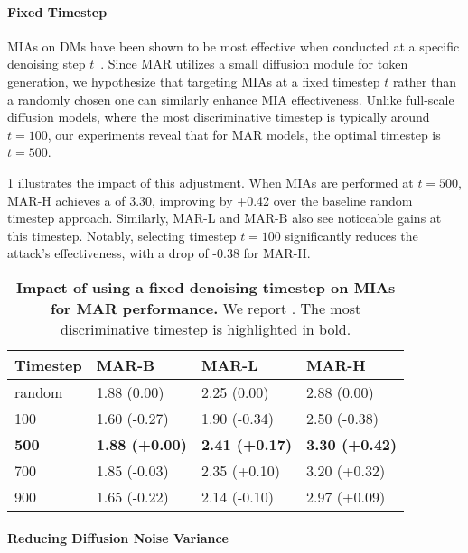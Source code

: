\paragraph{Fixed Timestep}
\label{app:fixed_timestep}

MIAs on DMs have been shown to be most effective when conducted at a specific denoising step $t$~\citep{carlini2023extracting}. Since MAR utilizes a small diffusion module for token generation, we hypothesize that targeting MIAs at a fixed timestep $t$ rather than a randomly chosen one can similarly enhance MIA effectiveness. Unlike full-scale diffusion models, where the most discriminative timestep is typically around $t = 100$, our experiments reveal that for MAR models, the optimal timestep is $t = 500$.  

\cref{tab:fixed_timestep} illustrates the impact of this adjustment. When MIAs are performed at $t = 500$, MAR-H achieves a \tprat{} of 3.30, improving by +0.42 over the baseline random timestep approach. Similarly, MAR-L and MAR-B also see noticeable gains at this timestep. Notably, selecting timestep $t = 100$ significantly reduces the attack's effectiveness, with a drop of -0.38 for MAR-H. 


\begin{table}[h!]
    \centering
    \scriptsize
    \caption{\textbf{Impact of  using a fixed denoising timestep on MIAs for MAR performance.} We report \tprat. The most discriminative timestep is highlighted in bold.}
    \label{tab:fixed_timestep}
\begin{tabular}{llll}
\toprule
Timestep & MAR-B & MAR-L & MAR-H \\
\midrule
random & 1.88 (0.00) & 2.25 (0.00) & 2.88 (0.00) \\
100 & 1.60 (-0.27) & 1.90 (-0.34) & 2.50 (-0.38) \\
\textbf{500} & \textbf{1.88 (+0.00)} & \textbf{2.41 (+0.17)} & \textbf{3.30 (+0.42)} \\
700 & 1.85 (-0.03) & 2.35 (+0.10) & 3.20 (+0.32) \\
900 & 1.65 (-0.22) & 2.14 (-0.10) & 2.97 (+0.09) \\
\bottomrule
\end{tabular}
\end{table}

\paragraph{Reducing Diffusion Noise Variance}
\label{app:mul}

